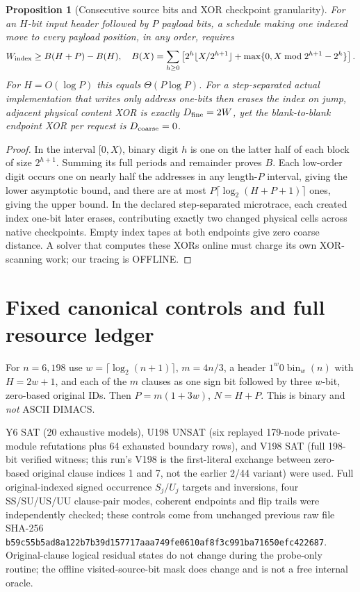 \documentclass[10pt]{article}
\newtheorem{proposition}{Proposition}
\begin{document}
\begin{proposition}[Consecutive source bits and XOR checkpoint granularity]
For an $H$-bit input header followed by $P$ payload bits, a schedule making one indexed move to \emph{every} payload position, in any order, requires
\[
W_{\rm index}\ge B(H+P)-B(H),\quad
B(X)=\sum_{h\ge0}\left[2^h\lfloor X/2^{h+1}\rfloor+
\max\{0,X\bmod2^{h+1}-2^h\}\right].
\]
For $H=O(\log P)$ this equals $\Theta(P\log P)$. For a step-separated actual implementation that writes only address one-bits then erases the index on jump, adjacent physical content XOR is exactly $D_{\rm fine}=2W$, yet the blank-to-blank endpoint XOR per request is $D_{\rm coarse}=0$.
\end{proposition}
\begin{proof}
In the interval $[0,X)$, binary digit $h$ is one on the latter half of each block of size $2^{h+1}$. Summing its full periods and remainder proves $B$. Each low-order digit occurs one on nearly half the addresses in any length-$P$ interval, giving the lower asymptotic bound, and there are at most $P\lceil\log_2(H+P+1)\rceil$ ones, giving the upper bound. In the declared step-separated microtrace, each created index one-bit later erases, contributing exactly two changed physical cells across native checkpoints. Empty index tapes at both endpoints give zero coarse distance. A solver that computes these XORs online must charge its own XOR-scanning work; our tracing is OFFLINE.
\end{proof}

\section{Fixed canonical controls and full resource ledger}
For $n=6,198$ use $w=\lceil\log_2(n+1)\rceil$, $m=4n/3$, a header $1^w0\operatorname{bin}_w(n)$ with $H=2w+1$, and each of the $m$ clauses as one sign bit followed by three $w$-bit, zero-based original IDs. Then $P=m(1+3w)$, $N=H+P$. This is binary and \emph{not} ASCII DIMACS.

Y6 SAT (20 exhaustive models), U198 UNSAT (six replayed 179-node private-module refutations plus 64 exhausted boundary rows), and V198 SAT (full 198-bit verified witness; this run's V198 is the first-literal exchange between zero-based original clause indices 1 and 7, not the earlier 2/44 variant) were used. Full original-indexed signed occurrence $S_j/U_j$ targets and inversions, four SS/SU/US/UU clause-pair modes, coherent endpoints and flip trails were independently checked; these controls come from unchanged previous raw file SHA-256 \texttt{b59c55b5ad8a122b7b39d157717aaa749fe0610af8f3c991ba71650efc422687}. Original-clause logical residual states do not change during the probe-only routine; the offline visited-source-bit mask does change and is not a free internal oracle.
\end{document}
